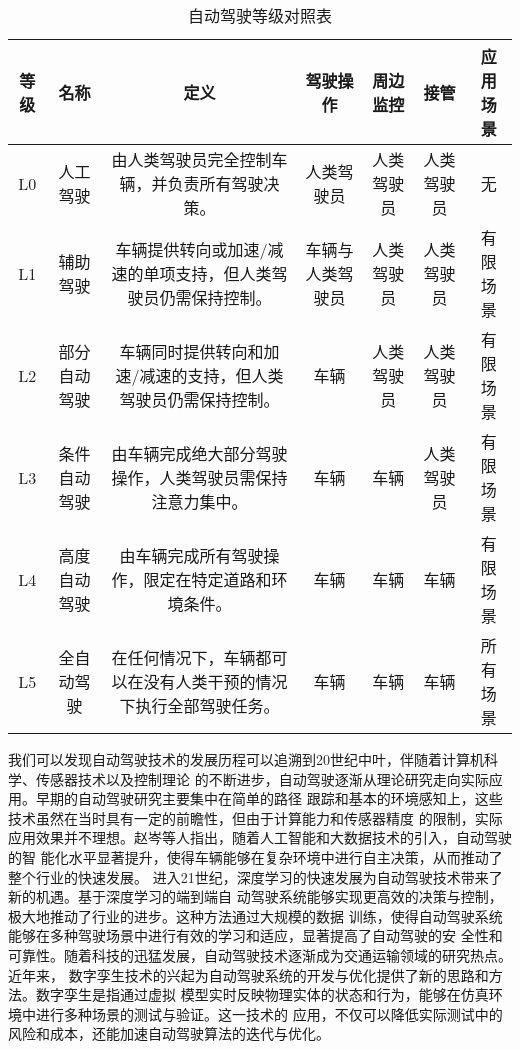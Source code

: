 	
\begin{table}[htbp]
	\centering
	\caption{自动驾驶等级对照表}
	\label{tab:driving-levels}
	\begin{tabular}{ccccccc}
		\toprule
		\textbf{等级} & \textbf{名称} & \textbf{定义} & \textbf{驾驶操作} & \textbf{周边监控} & \textbf{接管} & \textbf{应用场景} \\
		\midrule
		L0   & 人工驾驶     & 由人类驾驶员完全控制车辆，并负责所有驾驶决策。 & 人类驾驶员 & 人类驾驶员 & 人类驾驶员 & 无 \\
		L1   & 辅助驾驶     & 车辆提供转向或加速/减速的单项支持，但人类驾驶员仍需保持控制。 & 车辆与人类驾驶员 & 人类驾驶员 & 人类驾驶员 & 有限场景 \\
		L2   & 部分自动驾驶 & 车辆同时提供转向和加速/减速的支持，但人类驾驶员仍需保持控制。 & 车辆 & 人类驾驶员 & 人类驾驶员 & 有限场景 \\
		L3   & 条件自动驾驶 & 由车辆完成绝大部分驾驶操作，人类驾驶员需保持注意力集中。 & 车辆 & 车辆 & 人类驾驶员 & 有限场景 \\
		L4   & 高度自动驾驶 & 由车辆完成所有驾驶操作，限定在特定道路和环境条件。 & 车辆 & 车辆 & 车辆 & 有限场景 \\
		L5   & 全自动驾驶   & 在任何情况下，车辆都可以在没有人类干预的情况下执行全部驾驶任务。 & 车辆 & 车辆 & 车辆 & 所有场景 \\
		\bottomrule
	\end{tabular}
\end{table}




我们可以发现自动驾驶技术的发展历程可以追溯到20世纪中叶，伴随着计算机科学、传感器技术以及控制理论
的不断进步，自动驾驶逐渐从理论研究走向实际应用。早期的自动驾驶研究主要集中在简单的路径
跟踪和基本的环境感知上，这些技术虽然在当时具有一定的前瞻性，但由于计算能力和传感器精度
的限制，实际应用效果并不理想。赵岑等人指出，随着人工智能和大数据技术的引入，自动驾驶的智
能化水平显著提升，使得车辆能够在复杂环境中进行自主决策，从而推动了整个行业的快速发展\cite{小龙刘2024人工智能和大数据技术在自动驾驶中的应用}。
进入21世纪，深度学习的快速发展为自动驾驶技术带来了新的机遇。基于深度学习的端到端自
动驾驶系统能够实现更高效的决策与控制，极大地推动了行业的进步。这种方法通过大规模的数据
训练，使得自动驾驶系统能够在多种驾驶场景中进行有效的学习和适应，显著提高了自动驾驶的安
全性和可靠性。随着科技的迅猛发展，自动驾驶技术逐渐成为交通运输领域的研究热点\cite{丘德龙2018浅谈人工智能在汽车领域中的应用}。近年来，
数字孪生技术的兴起为自动驾驶系统的开发与优化提供了新的思路和方法。数字孪生是指通过虚拟
模型实时反映物理实体的状态和行为，能够在仿真环境中进行多种场景的测试与验证\cite{罗健炜2023基于数字孪生的自动驾驶仿真测试研究}。这一技术的
应用，不仅可以降低实际测试中的风险和成本，还能加速自动驾驶算法的迭代与优化。

